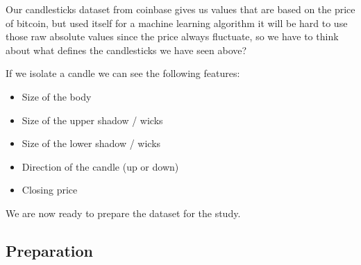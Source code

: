 \documentclass[
]{article}
\begin{document}
Our candlesticks dataset from coinbase gives us values that are based on
the price of bitcoin, but used itself for a machine learning algorithm
it will be hard to use those raw absolute values since the price always
fluctuate, so we have to think about what defines the candlesticks we
have seen above?

If we isolate a candle we can see the following features:

\begin{itemize}
\item
  Size of the body
\item
  Size of the upper shadow / wicks
\item
  Size of the lower shadow / wicks
\item
  Direction of the candle (up or down)
\item
  Closing price
\end{itemize}

We are now ready to prepare the dataset for the study.

\hypertarget{preparation}{%
\subsection{Preparation}\label{preparation}}
\end{document}
